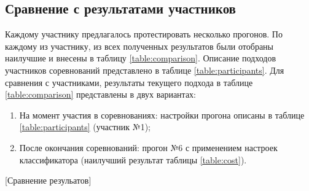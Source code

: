 \subsection{Сравнение с результатами участников}
Каждому участнику предлагалось протестировать несколько прогонов.
По каждому из участнику, из всех полученных результатов были отобраны
наилучшие и внесены в таблицу \ref{table:comparison}.
Описание подходов участников соревнований представлено в таблице
\ref{table:participants}.
Для сравнения с участниками, результаты текущего подхода в таблице
\ref{table:comparison} представлены в двух вариантах:
\begin{enumerate}
    \item На момент участия в соревнованиях: настройки прогона описаны
        в таблице \ref{table:participants} (участник №1);
    \item После окончания соревнований: прогон №6 с применением настроек
        классификатора (наилучший результат таблицы \ref{table:cost}).
\end{enumerate}



[Сравнение резульатов]
